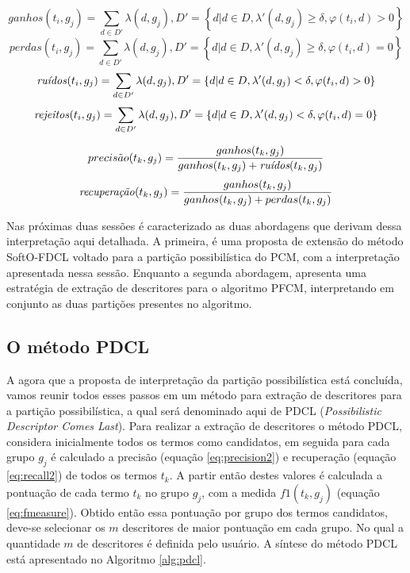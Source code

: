 \begin{equation}
  ganhos(t_i,g_j) = 
  \sum_{
      d \in D' 
  } \lambda(d,g_j), D' = \left\{d | d \in D, \lambda'(d,g_j) \geq \delta, \varphi(t_i,d) > 0
  \right\}
  \label{eq:ganhos}
\end{equation}
\begin{equation}
  perdas(t_i,g_j) = 
  \sum_{
      d \in D' 
  } \lambda(d,g_j), D' = \left\{d | d \in D, \lambda'(d,g_j) \geq \delta, \varphi(t_i,d) = 0
  \right\}
  \label{eq:perdas}
\end{equation}
\begin{equation}
  \text{\it ruídos\/}(t_i,g_j) = 
  \sum_{
      d \in D' 
  } \lambda(d,g_j), D' = \left\{d | d \in D, \lambda'(d,g_j) < \delta, \varphi(t_i,d) > 0 \right\}
  \label{eq:ruidos}
\end{equation}
\begin{equation}
  \text{\it rejeitos\/}(t_i,g_j) = 
  \sum_{
      d \in D' 
  } \lambda(d,g_j), D' = \left\{d | d \in D, \lambda'(d,g_j) < \delta, \varphi(t_i,d) = 0 \right\}
  \label{eq:rejeitos}
\end{equation}

\begin{equation}
  precis\tilde{a}o(t_k,g_j) = \frac{ganhos(t_k,g_j)}{ganhos(t_k,g_j) + \text{\it ruídos}(t_k,g_j)}
  \label{eq:precision2}
\end{equation}
\begin{equation}
  \text{\it recuperação\/}(t_k,g_j) = \frac{ganhos(t_k,g_j)}{ganhos(t_k,g_j) + perdas(t_k,g_j)}
  \label{eq:recall2}
\end{equation}

Nas próximas duas sessões é caracterizado as duas abordagens que derivam dessa interpretação aqui
detalhada. A primeira, é uma proposta de extensão do método SoftO-FDCL voltado para a partição
possibilística do PCM, com a interpretação apresentada nessa sessão. Enquanto a segunda abordagem,
apresenta uma estratégia de extração de descritores para o algoritmo PFCM, interpretando em conjunto
as duas partições presentes no algoritmo.

\subsection{O método PDCL}

A agora que a proposta de interpretação da partição possibilística está concluída, vamos reunir
todos esses passos em um método para extração de descritores para a partição possibilística, a qual
será denominado aqui de PDCL ({\it Possibilistic Descriptor Comes Last\/}). Para realizar a extração
de descritores o método PDCL, considera inicialmente todos os termos como candidatos, em seguida
para cada grupo $g_j$ é calculado a precisão (equação \ref{eq:precision2}) e recuperação (equação
\ref{eq:recall2}) de todos os termos $t_k$. A partir então destes valores é calculada a
pontuação de cada termo $t_k$ no grupo $g_j$, com a medida $f1(t_k,g_j)$ (equação
\ref{eq:fmeasure}). Obtido então essa pontuação por grupo dos termos candidatos, deve-se selecionar
os $m$ descritores de maior pontuação em cada grupo. No qual a quantidade $m$ de descritores é
definida pelo usuário. A síntese do método PDCL está apresentado no Algoritmo \ref{alg:pdcl}.

